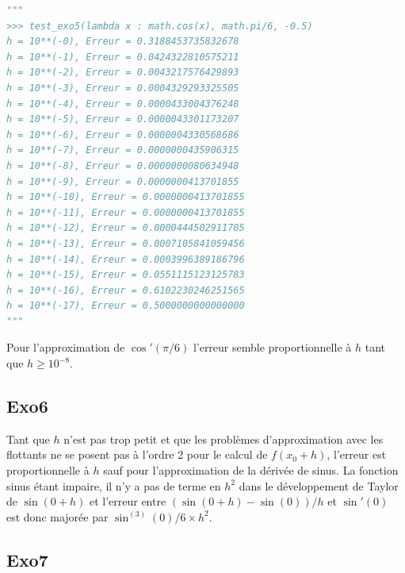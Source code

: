 \documentclass[
  11pt,
]{article}
\newcounter{exo}
\newcounter{prop}
\begin{document}
\begin{lstlisting}[language=Python]
"""
>>> test_exo5(lambda x : math.cos(x), math.pi/6, -0.5)
h = 10**(-0), Erreur = 0.3188453735832678
h = 10**(-1), Erreur = 0.0424322810575211
h = 10**(-2), Erreur = 0.0043217576429893
h = 10**(-3), Erreur = 0.0004329293325505
h = 10**(-4), Erreur = 0.0000433004376248
h = 10**(-5), Erreur = 0.0000043301173207
h = 10**(-6), Erreur = 0.0000004330568686
h = 10**(-7), Erreur = 0.0000000435906315
h = 10**(-8), Erreur = 0.0000000080634948
h = 10**(-9), Erreur = 0.0000000413701855
h = 10**(-10), Erreur = 0.0000000413701855
h = 10**(-11), Erreur = 0.0000000413701855
h = 10**(-12), Erreur = 0.0000444502911705
h = 10**(-13), Erreur = 0.0007105841059456
h = 10**(-14), Erreur = 0.0003996389186796
h = 10**(-15), Erreur = 0.0551115123125783
h = 10**(-16), Erreur = 0.6102230246251565
h = 10**(-17), Erreur = 0.5000000000000000
"""
\end{lstlisting}

Pour l'approximation de \(\cos'(\pi/6)\) l'erreur semble proportionnelle
à \(h\) tant que \(h \geqslant 10^{-8}\).

\hypertarget{exo6}{%
\subsection{Exo6}\label{exo6}}

Tant que \(h\) n'est pas trop petit et que les problèmes d'approximation
avec les flottants ne se posent pas à l'ordre 2 pour le calcul de
\(f(x_0+h)\), l'erreur est proportionnelle à \(h\) sauf pour
l'approximation de la dérivée de sinus. La fonction sinus étant impaire,
il n'y a pas de terme en \(h^2\) dans le développement de Taylor de
\(\sin(0+h)\) et l'erreur entre \((\sin(0+h)-\sin(0))/h\) et
\(\sin'(0)\) est donc majorée par \(\sin^{(3)}(0)/6 \times h^2\).

\hypertarget{exo7}{%
\subsection{Exo7}\label{exo7}}
\end{document}
